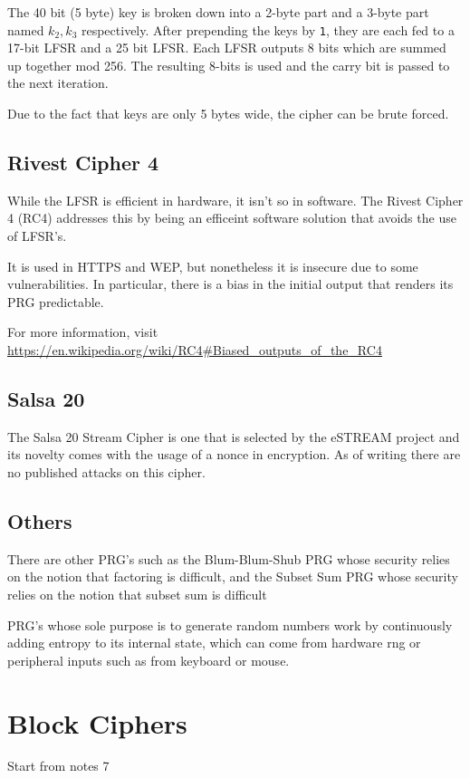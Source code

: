 \documentclass{article}
\begin{document}
\begin{multicols}{2}
The 40 bit (5 byte) key is broken down into a 2-byte part and a 3-byte part named $k_2, k_3$ respectively. After prepending the keys by \texttt{1}, they are each fed to a 17-bit LFSR and a 25 bit LFSR. Each LFSR outputs 8 bits which are summed up together mod 256. The resulting 8-bits is used and the carry bit is passed to the next iteration.

Due to the fact that keys are only 5 bytes wide, the cipher can be brute forced.

\subsection{Rivest Cipher 4}

While the LFSR is efficient in hardware, it isn't so in software. The Rivest Cipher 4 (RC4) addresses this by being an efficeint software solution that avoids the use of LFSR's.

It is used in HTTPS and WEP, but nonetheless it is insecure due to some vulnerabilities. In particular, there is a bias in the initial output that renders its PRG predictable.

For more information, visit \url{https://en.wikipedia.org/wiki/RC4#Biased_outputs_of_the_RC4}

\subsection{Salsa 20}

The Salsa 20 Stream Cipher is one that is selected by the eSTREAM project and its novelty comes with the usage of a nonce in encryption. As of writing there are no published attacks on this cipher.

\subsection{Others}

There are other PRG's such as the Blum-Blum-Shub PRG whose security relies on the notion that factoring is difficult, and the Subset Sum PRG whose security relies on the notion that subset sum is difficult

PRG's whose sole purpose is to generate random numbers work by continuously adding entropy to its internal state, which can come from hardware rng or peripheral inputs such as from keyboard or mouse.

\section{Block Ciphers}

Start from notes 7

\end{multicols}
\end{document}
